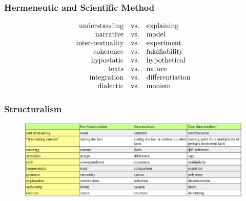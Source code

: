 \documentclass[xcolor=dvipsnames]{beamer}
\begin{document}

\begin{frame}
  \frametitle{Hermeneutic and Scientific Method}
  \begin{equation}
    \label{eq:paumatae}
    \begin{array}{rcl}
      \mbox{understanding} & \mbox{vs.} & \mbox{explaining} \\
      \mbox{narrative} & \mbox{vs.} & \mbox{model} \\
      \mbox{inter-textuality} & \mbox{vs.} & \mbox{experiment} \\
      \mbox{coherence} & \mbox{vs.} & \mbox{falsifiability} \\
      \mbox{hypostatic} & \mbox{vs.} & \mbox{hypothetical} \\
      \mbox{texts} & \mbox{vs.} & \mbox{nature} \\
      \mbox{integration} & \mbox{vs.} & \mbox{differentiation} \\
      \mbox{dialectic} & \mbox{vs.} & \mbox{monism} \\
    \end{array}\notag
  \end{equation}
\end{frame}

\begin{frame}
  \frametitle{Structuralism}
\begin{figure}[h]
\includegraphics[scale=.3]{./structable.png}
\end{figure}
\end{frame}
\end{document}
